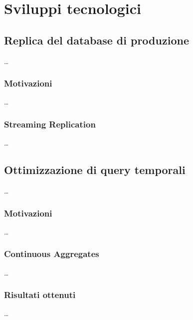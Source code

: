\chapter{Sviluppi tecnologici}\label{ch:sviluppi}

\section{Replica del database di produzione}\label{sec:replica}
\ldots

\subsection{Motivazioni}\label{ssec:replica-motivazioni}
\ldots

\subsection{Streaming Replication}\label{ssec:streaming-replication}
\ldots

\section{Ottimizzazione di query temporali}\label{sec:cont-aggr}
\ldots

\subsection{Motivazioni}\label{ssec:cont-aggr-motivazioni}
\ldots

\subsection{Continuous Aggregates}\label{ssec:cont-aggr}
\ldots

\subsection{Risultati ottenuti}\label{ssec:cont-aggr-risultati}
\ldots